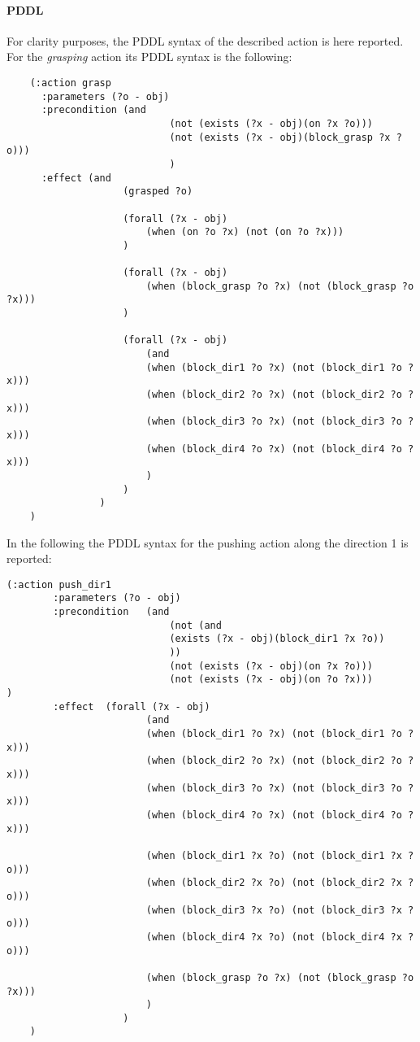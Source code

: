\paragraph{PDDL}
For clarity purposes, the PDDL syntax of the described action is here reported. 
For the \textit{grasping} action its PDDL syntax is the following:
\begin{verbatim}
	(:action grasp
	  :parameters (?o - obj)
	  :precondition (and
	  			    		(not (exists (?x - obj)(on ?x ?o)))
			  			    (not (exists (?x - obj)(block_grasp ?x ?o)))
			  			    )
	  :effect (and
	  				(grasped ?o)

	  				(forall (?x - obj)
	  					(when (on ?o ?x) (not (on ?o ?x)))
	  				)

	  				(forall (?x - obj)
	  					(when (block_grasp ?o ?x) (not (block_grasp ?o ?x)))
	  				)

	  				(forall (?x - obj)
	  					(and
	  					(when (block_dir1 ?o ?x) (not (block_dir1 ?o ?x)))
					    (when (block_dir2 ?o ?x) (not (block_dir2 ?o ?x)))
					    (when (block_dir3 ?o ?x) (not (block_dir3 ?o ?x)))
					    (when (block_dir4 ?o ?x) (not (block_dir4 ?o ?x)))
	  					)
	  				)
	  			)
	)
\end{verbatim}
In the following the PDDL syntax for the pushing action along the direction 1 is reported:
\begin{verbatim}
(:action push_dir1
		:parameters (?o - obj)
		:precondition 	(and	
				 			(not (and
				 			(exists (?x - obj)(block_dir1 ?x ?o))
				 			))
				 			(not (exists (?x - obj)(on ?x ?o)))
				 			(not (exists (?x - obj)(on ?o ?x)))
) 
		:effect  (forall (?x - obj)
				    	(and
				    	(when (block_dir1 ?o ?x) (not (block_dir1 ?o ?x)))
					    (when (block_dir2 ?o ?x) (not (block_dir2 ?o ?x)))
					    (when (block_dir3 ?o ?x) (not (block_dir3 ?o ?x)))
					    (when (block_dir4 ?o ?x) (not (block_dir4 ?o ?x)))

					    (when (block_dir1 ?x ?o) (not (block_dir1 ?x ?o)))
					    (when (block_dir2 ?x ?o) (not (block_dir2 ?x ?o)))
					    (when (block_dir3 ?x ?o) (not (block_dir3 ?x ?o)))
					    (when (block_dir4 ?x ?o) (not (block_dir4 ?x ?o)))

 	  					(when (block_grasp ?o ?x) (not (block_grasp ?o ?x)))
					    )
				    )	    
	)

\end{verbatim}

\mbox{}


